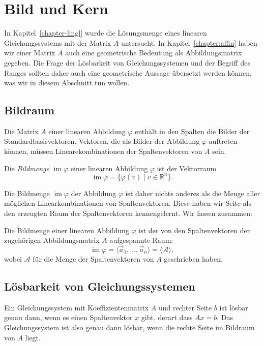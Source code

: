 %
%
%
\section{Bild und Kern\label{section:bildundkern}}
In Kapitel~\ref{chapter-lingl} wurde die Lösungsmenge eines linearen
Gleichungssystems mit der Matrix $A$ untersucht.
In Kapitel~\ref{chapter:affin} 
haben wir einer Matrix $A$ auch eine geometrische Bedeutung
als Abbildungsmatrix gegeben.
Die Frage der Lösbarkeit von Gleichungssystemen und der Begriff des
Ranges sollten daher auch eine geometrische Aussage übersetzt
werden können, was wir in diesem Abschnitt tun wollen.

\subsection{Bildraum}
Die Matrix $A$ einer linearen Abbildung $\varphi$ enthält in den Spalten
die Bilder der Standardbasisvektoren.
Vektoren, die als Bilder der Abbildung $\varphi$ auftreten können,
müssen Linearekombinationen der Spaltenvektoren von $A$ sein.
\begin{definition}
Die {\em Bildmenge} $\operatorname{im}\varphi$ einer linearen Abbildung
$\varphi$ ist der Vektorraum
\[
\operatorname{im}\varphi
=
\{\varphi(v)\;|\;v\in\mathbb R^n\}.
\]
\end{definition}

Die Bildmenge $\operatorname{im}\varphi$ der Abbildung $\varphi$ ist
daher nichts anderes als die Menge aller möglichen Linearkombinationen
von Spaltenvektoren.
Diese haben wir Seite \pageref{skript:affin:koordinaten:aufgespannt}
als den erzeugten Raum der Spaltenvektoren kennengelernt.
Wir fassen zusammen:
\begin{satz}
Die Bildmenge einer linearen Abbildung $\varphi$ ist der von den
Spaltenvektoren der zugehörigen Abbildungsmatrix $A$ aufgespannte Raum:
\[
\operatorname{im}\varphi
=
\langle\vec{a}_1,\dots,\vec{a}_n\rangle
=
\langle\mathcal{A}\rangle,
\]
wobei $\mathcal{A}$ für die Menge der Spaltenvektoren von $A$ geschrieben
haben.
\end{satz}

\subsection{Lösbarkeit von Gleichungssystemen}
Ein Gleichungssystem mit Koeffizientenmatrix $A$ und rechter Seite $b$
ist lösbar genau dann, wenn es einen Spaltenvektor $x$ gibt, derart
dass $Ax=b$.
Das Gleichungssystem ist also genau dann lösbar, wenn die rechte Seite
im Bildraum von $A$ liegt.

